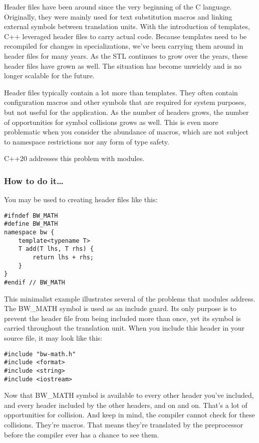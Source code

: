 
Header files have been around since the very beginning of the C language. Originally, they were mainly used for text substitution macros and linking external symbols between translation units. With the introduction of templates, C++ leveraged header files to carry actual code. Because templates need to be recompiled for changes in specializations, we've been carrying them around in header files for many years. As the STL continues to grow over the years, these header files have grown as well. The situation has become unwieldy and is no longer scalable for the future.

Header files typically contain a lot more than templates. They often contain configuration macros and other symbols that are required for system purposes, but not useful for the application. As the number of headers grows, the number of opportunities for symbol collisions grows as well. This is even more problematic when you consider the abundance of macros, which are not subject to namespace restrictions nor any form of type safety.

C++20 addresses this problem with modules.

\subsubsection{How to do it…}

You may be used to creating header files like this:

\begin{lstlisting}[style=styleCXX]
#ifndef BW_MATH
#define BW_MATH
namespace bw {
	template<typename T>
	T add(T lhs, T rhs) {
		return lhs + rhs;
	}
}
#endif // BW_MATH
\end{lstlisting}

This minimalist example illustrates several of the problems that modules address. The BW\_MATH symbol is used as an include guard. Its only purpose is to prevent the header file from being included more than once, yet its symbol is carried throughout the translation unit. When you include this header in your source file, it may look like this:

\begin{lstlisting}[style=styleCXX]
#include "bw-math.h"
#include <format>
#include <string>
#include <iostream>
\end{lstlisting}

Now that BW\_MATH symbol is available to every other header you've included, and every header included by the other headers, and on and on. That's a lot of opportunities for collision. And keep in mind, the compiler cannot check for these collisions. They're macros. That means they're translated by the preprocessor before the compiler ever has a chance to see them.

